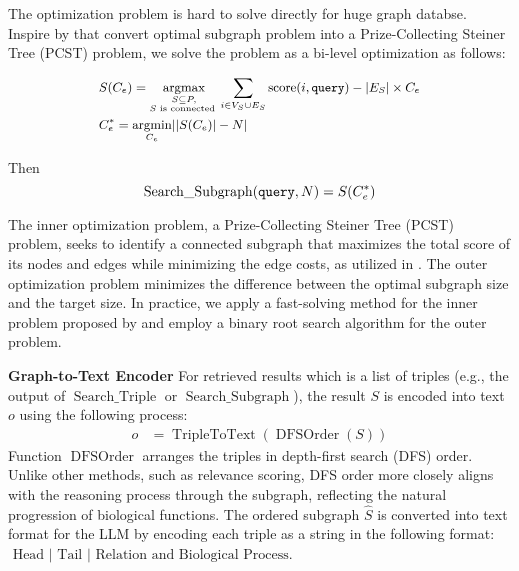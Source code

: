 The optimization problem is hard to solve directly for huge graph databse. Inspire by \cite{he2024g} that convert optimal subgraph problem into a Prize-Collecting Steiner Tree (PCST) problem, we solve the problem as a bi-level optimization 
as follows:

\begin{equation}
\small
\begin{aligned}
&S(C_e)=\underset{\substack{S \subseteq P, \\ S \text { is connected }}}{\operatorname{argmax}} \sum_{i \in V_S \cup E_S} \operatorname{score}(i, \texttt{query})-\left|E_S\right| \times C_e\\
& C_e^* = \underset{\substack{C_e}}{\operatorname{argmin}}  | |S(C_e)|-N|\\
\end{aligned}
\end{equation}

Then 
$$
\operatorname{Search\_Subgraph}(\texttt{query}, N)= S(C_e^*)\\
$$

The inner optimization problem, a Prize-Collecting Steiner Tree (PCST) problem, seeks to identify a connected subgraph that maximizes the total score of its nodes and edges while minimizing the edge costs, as utilized in \citep{he2024g}. The outer optimization problem minimizes the difference between the optimal subgraph size and the target size. In practice, we apply a fast-solving method for the inner problem proposed by \citep{hegde2015nearly} and employ a binary root search algorithm for the outer problem.


\textbf{Graph-to-Text Encoder} For retrieved results which is a list of triples (e.g., the output of $\operatorname{Search\_Triple}$ or $\operatorname{Search\_Subgraph}$), the result $S$ is encoded into text $o$ using the following process:
\begin{equation}
\begin{aligned}
o&=\operatorname{TripleToText}(\operatorname{DFSOrder}(S))
\end{aligned}
\end{equation}
Function $\operatorname{DFSOrder}$ arranges the triples in depth-first search (DFS) order. Unlike other methods, such as relevance scoring, DFS order more closely aligns with the reasoning process through the subgraph, reflecting the natural progression of biological functions. The ordered subgraph $\hat{S}$ is converted into text format for the LLM by encoding each triple as a string in the following format:
$\text{ Head } |  \text{ Tail } | \text{ Relation and Biological Process}$.


